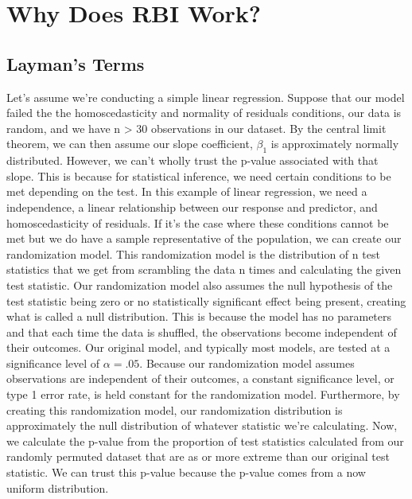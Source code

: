 
\section{Why Does RBI Work?}

\subsection{Layman's Terms}

Let’s assume we're conducting a simple linear regression. Suppose that our model failed the the homoscedasticity and normality of residuals conditions, our data is random, and we have n > 30 observations in our dataset. By the central limit theorem, we can then assume our slope coefficient, $\beta_1$ is approximately normally distributed. However, we can’t wholly trust the p-value associated with that slope. This is because for statistical inference, we need certain conditions to be met depending on the test. In this example of linear regression, we need a independence, a linear relationship between our response and predictor, and homoscedasticity of residuals. If it’s the case where these conditions cannot be met but we do have a sample representative of the population, we can create our randomization model. This randomization model is the distribution of n test statistics that we get from scrambling the data n times and calculating the given test statistic. Our randomization model also assumes the null hypothesis of the test statistic being zero or no statistically significant effect being present, creating what is called a null distribution. This is because the model has no parameters and that each time the data is shuffled, the observations become independent of their outcomes. Our original model, and typically most models, are tested at a significance level of $\alpha=.05$. Because our randomization model assumes observations are independent of their outcomes, a constant significance level, or type 1 error rate, is held constant for the randomization model. Furthermore, by creating this randomization model, our randomization distribution is approximately the null distribution of whatever statistic we're calculating. Now, we calculate the p-value from the proportion of test statistics calculated from our randomly permuted dataset that are as or more extreme than our original test statistic. We can trust this p-value because the p-value comes from a now uniform distribution. 



